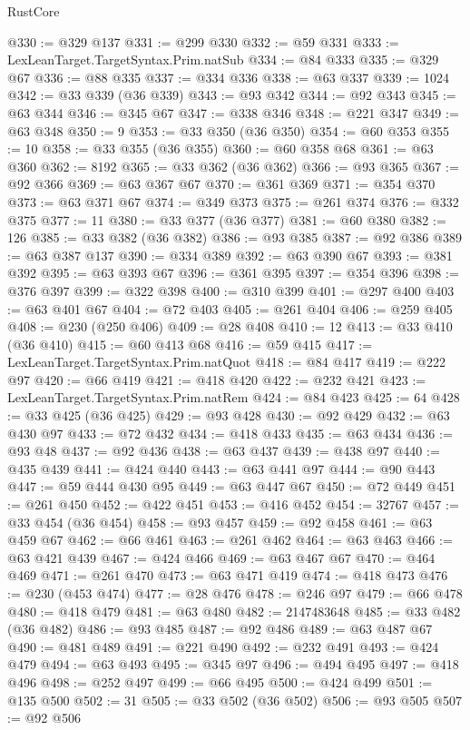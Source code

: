 \begin{lexlean}{RustCore}
\begin{coremodule}
@330 := @329 @137
@331 := @299 @330
@332 := @59 @331
@333 := LexLeanTarget.TargetSyntax.Prim.natSub
@334 := @84 @333
@335 := @329 @67
@336 := @88 @335
@337 := @334 @336
@338 := @63 @337
@339 := 1024
@342 := @33 @339 (@36 @339)
@343 := @93 @342
@344 := @92 @343
@345 := @63 @344
@346 := @345 @67
@347 := @338 @346
@348 := @221 @347
@349 := @63 @348
@350 := 9
@353 := @33 @350 (@36 @350)
@354 := @60 @353
@355 := 10
@358 := @33 @355 (@36 @355)
@360 := @60 @358 @68
@361 := @63 @360
@362 := 8192
@365 := @33 @362 (@36 @362)
@366 := @93 @365
@367 := @92 @366
@369 := @63 @367 @67
@370 := @361 @369
@371 := @354 @370
@373 := @63 @371 @67
@374 := @349 @373
@375 := @261 @374
@376 := @332 @375
@377 := 11
@380 := @33 @377 (@36 @377)
@381 := @60 @380
@382 := 126
@385 := @33 @382 (@36 @382)
@386 := @93 @385
@387 := @92 @386
@389 := @63 @387 @137
@390 := @334 @389
@392 := @63 @390 @67
@393 := @381 @392
@395 := @63 @393 @67
@396 := @361 @395
@397 := @354 @396
@398 := @376 @397
@399 := @322 @398
@400 := @310 @399
@401 := @297 @400
@403 := @63 @401 @67
@404 := @72 @403
@405 := @261 @404
@406 := @259 @405
@408 := @230 (@250 @406)
@409 := @28 @408
@410 := 12
@413 := @33 @410 (@36 @410)
@415 := @60 @413 @68
@416 := @59 @415
@417 := LexLeanTarget.TargetSyntax.Prim.natQuot
@418 := @84 @417
@419 := @222 @97
@420 := @66 @419
@421 := @418 @420
@422 := @232 @421
@423 := LexLeanTarget.TargetSyntax.Prim.natRem
@424 := @84 @423
@425 := 64
@428 := @33 @425 (@36 @425)
@429 := @93 @428
@430 := @92 @429
@432 := @63 @430 @97
@433 := @72 @432
@434 := @418 @433
@435 := @63 @434
@436 := @93 @48
@437 := @92 @436
@438 := @63 @437
@439 := @438 @97
@440 := @435 @439
@441 := @424 @440
@443 := @63 @441 @97
@444 := @90 @443
@447 := @59 @444 @430 @95
@449 := @63 @447 @67
@450 := @72 @449
@451 := @261 @450
@452 := @422 @451
@453 := @416 @452
@454 := 32767
@457 := @33 @454 (@36 @454)
@458 := @93 @457
@459 := @92 @458
@461 := @63 @459 @67
@462 := @66 @461
@463 := @261 @462
@464 := @63 @463
@466 := @63 @421 @439
@467 := @424 @466
@469 := @63 @467 @67
@470 := @464 @469
@471 := @261 @470
@473 := @63 @471 @419
@474 := @418 @473
@476 := @230 (@453 @474)
@477 := @28 @476
@478 := @246 @97
@479 := @66 @478
@480 := @418 @479
@481 := @63 @480
@482 := 2147483648
@485 := @33 @482 (@36 @482)
@486 := @93 @485
@487 := @92 @486
@489 := @63 @487 @67
@490 := @481 @489
@491 := @221 @490
@492 := @232 @491
@493 := @424 @479
@494 := @63 @493
@495 := @345 @97
@496 := @494 @495
@497 := @418 @496
@498 := @252 @497
@499 := @66 @495
@500 := @424 @499
@501 := @135 @500
@502 := 31
@505 := @33 @502 (@36 @502)
@506 := @93 @505
@507 := @92 @506

\end{coremodule}
\end{lexlean}
